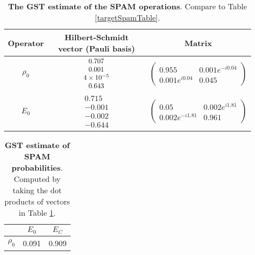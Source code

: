 {\begin{table}[h]
\begin{center}
\begin{tabular}[l]{|c|c|c|}
\hline
Operator & Hilbert-Schmidt vector (Pauli basis) & Matrix \\ \hline
$\rho_{0}$ & $ \begin{array}{c}
0.707 \\ 
0.001 \\ 
4\times 10^{-5} \\ 
0.643
 \end{array} $
 & $ \left(\!\!\begin{array}{cc}
0.955 & 0.001e^{-i0.04} \\ 
0.001e^{i0.04} & 0.045
 \end{array}\!\!\right) $
 \\ \hline
$E_{0}$ & $ \begin{array}{c}
0.715 \\ 
-0.001 \\ 
-0.002 \\ 
-0.644
 \end{array} $
 & $ \left(\!\!\begin{array}{cc}
0.05 & 0.002e^{i1.81} \\ 
0.002e^{-i1.81} & 0.961
 \end{array}\!\!\right) $
 \\ \hline
\end{tabular}

\caption{\textbf{The GST estimate of the SPAM operations}.  Compare to Table \ref{targetSpamTable}.\label{bestCPTPGatesetSpamTable}}
\end{center}
\end{table}

\begin{table}[h]
\begin{center}
\begin{tabular}[l]{|c|c|c|}
\hline
 & $E_{0}$ & $E_C$ \\ \hline
$\rho_{0}$ & 0.091 & 0.909 \\ \hline
\end{tabular}

\caption{\textbf{GST estimate of SPAM probabilities}.  Computed by taking the dot products of vectors in Table \ref{bestCPTPGatesetSpamTable}.\label{bestCPTPGatesetSpamParametersTable}}
\end{center}
\end{table}

}
